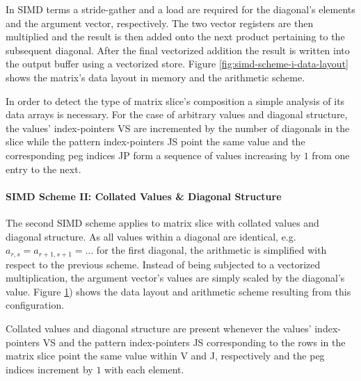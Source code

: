           In SIMD terms a stride-gather and a load are required for the diagonal's elements and the argument vector,
          respectively. The two vector registers are then multiplied and the result is then added onto the next product
          pertaining to the subsequent diagonal. After the final vectorized addition the result is written into the
          output buffer using a vectorized store. Figure \ref{fig:simd-scheme-i-data-layout} shows the matrix's data
          layout in memory and the arithmetic scheme.

          In order to detect the type of matrix slice's composition a simple analysis of its data arrays is necessary.
          For the case of arbitrary values and diagonal structure, the values' index-pointers VS are incremented by the
          number of diagonals in the slice while the pattern index-pointers JS point the same value and the
          corresponding peg indices JP form a sequence of values increasing by $1$ from one entry to the next.

        \paragraph{SIMD Scheme II: Collated Values \& Diagonal Structure}

          The second SIMD scheme applies to matrix slice with collated values and diagonal structure. As all values
          within a diagonal are identical, e.g. $a_{r,s} = a_{r+1, s+1} = \ldots$ for the first diagonal, the arithmetic
          is simplified with respect to the previous scheme. Instead of being subjected to a vectorized multiplication,
          the argument vector's values are simply scaled by the diagonal's value. Figure \ref{fig:simd-scheme-ii-data-layout})
          shows the data layout and arithmetic scheme resulting from this configuration.

          Collated values and diagonal structure are present whenever the values' index-pointers VS and the pattern
          index-pointers JS corresponding to the rows in the matrix slice point the same value within V and J,
          respectively and the peg indices increment by $1$ with each element.

          \begin{figure}[H]
            \centering
            \captionsetup{width=0.9\columnwidth}
            
            \label{fig:simd-scheme-ii-data-layout}
          \end{figure}

